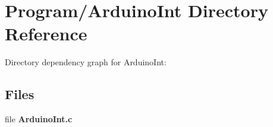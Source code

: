 \section{Program/\-Arduino\-Int Directory Reference}
\label{dir_ae9f9230202598cfbcea1e1894bf5d4a}
Directory dependency graph for Arduino\-Int\-:
\subsection*{Files}
\begin{DoxyCompactItemize}
\item 
file {\bf Arduino\-Int.\-c}
\end{DoxyCompactItemize}
